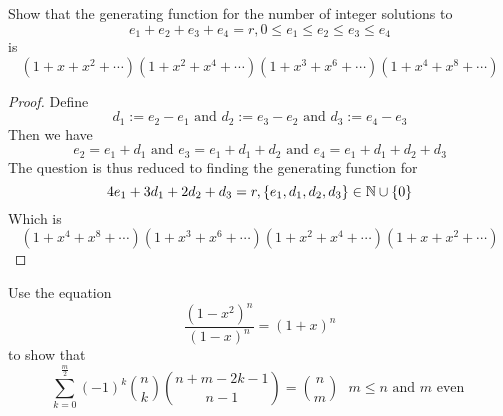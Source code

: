 \documentclass{report}
\begin{document}
\begin{question}{}{}
Show that the generating function for the number of integer solutions to 
\begin{equation*}
e_1+e_2+e_3+e_4=r,0\leq e_1\leq e_2\leq e_3\leq e_4
\end{equation*}
is
\begin{equation*}
  \left(1+x+x^2+ \cdots \right)\left(1+x^2+x^4+\cdots \right)\left(1+x^3+x^6+\cdots \right)\left(1+x^4+x^8+\cdots \right)
\end{equation*}
\end{question}
\begin{proof}
Define
\begin{equation*}
d_1:=e_2-e_1\text{ and }d_2:=e_3-e_2\text{ and }d_3:=e_4-e_3
\end{equation*}
Then we have
\begin{equation*}
e_2=e_1+d_1\text{ and }e_3=e_1+d_1+d_2\text{ and }e_4=e_1+d_1+d_2+d_3
\end{equation*}
The question is thus reduced to finding the generating function for 
\begin{equation*}
4e_1+3d_1+2d_2+d_3=r, \{ e_1,d_1,d_2,d_3 \}\in \mathbb{N} \cup \{ 0 \}
\end{equation*}
Which is 
\begin{equation*}
\left(1+x^4+x^8+\cdots \right)\left(1+x^3+x^6+\cdots \right)\left(1+x^2+x^4+\cdots \right)\left(1+x+x^2+ \cdots \right)
\end{equation*}
\end{proof}
\begin{question}{}{}
Use the equation
\begin{equation*}
\frac{\left(1-x^2 \right)^n}{\left(1-x \right)^n}=\left(1+x \right)^n
\end{equation*}
to show that
\begin{equation*}
\sum_{k=0}^{\frac{m}{2}}\left(-1 \right)^k \binom{n}{k} \binom{n+m-2k-1}{n-1}=\binom{n}{m}\text{ $m\leq n\text{ and }m$ even }
\end{equation*}
\end{question}
\end{document}
